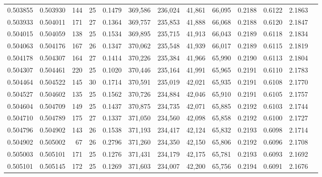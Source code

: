 \begin{tabular}{rrrrrrrrrrrrr}
0.503855 & 0.503930 & 144 &  25 &                                     0.1479 & 369,586 & 236,024 &  41,861 &  66,095 & 0.2188 & 0.6122 & 2.1863 \\
0.503933 & 0.504011 & 171 &  27 &                                     0.1364 & 369,757 & 235,853 &  41,888 &  66,068 & 0.2188 & 0.6120 & 2.1847 \\
0.504015 & 0.504059 & 138 &  25 &                                     0.1534 & 369,895 & 235,715 &  41,913 &  66,043 & 0.2189 & 0.6118 & 2.1834 \\
0.504063 & 0.504176 & 167 &  26 &                                     0.1347 & 370,062 & 235,548 &  41,939 &  66,017 & 0.2189 & 0.6115 & 2.1819 \\
0.504178 & 0.504307 & 164 &  27 &                                     0.1414 & 370,226 & 235,384 &  41,966 &  65,990 & 0.2190 & 0.6113 & 2.1804 \\
0.504307 & 0.504461 & 220 &  25 &                                     0.1020 & 370,446 & 235,164 &  41,991 &  65,965 & 0.2191 & 0.6110 & 2.1783 \\
0.504464 & 0.504522 & 145 &  30 &                                     0.1714 & 370,591 & 235,019 &  42,021 &  65,935 & 0.2191 & 0.6108 & 2.1770 \\
0.504527 & 0.504602 & 135 &  25 &                                     0.1562 & 370,726 & 234,884 &  42,046 &  65,910 & 0.2191 & 0.6105 & 2.1757 \\
0.504604 & 0.504709 & 149 &  25 &                                     0.1437 & 370,875 & 234,735 &  42,071 &  65,885 & 0.2192 & 0.6103 & 2.1744 \\
0.504710 & 0.504789 & 175 &  27 &                                     0.1337 & 371,050 & 234,560 &  42,098 &  65,858 & 0.2192 & 0.6100 & 2.1727 \\
0.504796 & 0.504902 & 143 &  26 &                                     0.1538 & 371,193 & 234,417 &  42,124 &  65,832 & 0.2193 & 0.6098 & 2.1714 \\
0.504902 & 0.505002 &  67 &  26 &                                     0.2796 & 371,260 & 234,350 &  42,150 &  65,806 & 0.2192 & 0.6096 & 2.1708 \\
0.505003 & 0.505101 & 171 &  25 &                                     0.1276 & 371,431 & 234,179 &  42,175 &  65,781 & 0.2193 & 0.6093 & 2.1692 \\
0.505101 & 0.505145 & 172 &  25 &                                     0.1269 & 371,603 & 234,007 &  42,200 &  65,756 & 0.2194 & 0.6091 & 2.1676 \\

\end{tabular}
